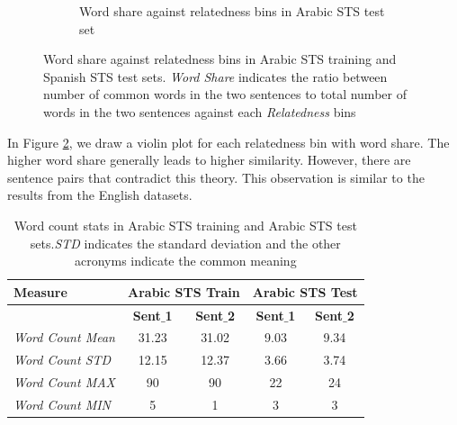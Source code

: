\begin{enumerate}
\begin{figure}
\begin{subfigure}[b]{.5\textwidth}
		\caption{Word share against relatedness bins in Arabic STS test set}
		\label{fig:arabic_sts_test_word_share}
	\end{subfigure}
	\caption[Word share against relatedness bins in Arabic STS training and Arabic STS test sets.]{Word share against relatedness bins in Arabic STS training and Spanish STS test sets. \textit{Word Share} indicates the ratio between number of common words in the two sentences to total number of words in the two sentences against each \textit{Relatedness} bins}
	\label{fig:arabic_sts_word_share}
\end{figure}

In Figure \ref{fig:arabic_sts_word_share}, we draw a violin plot for each relatedness bin with word share. The higher word share generally leads to higher similarity. However, there are sentence pairs that contradict this theory. This observation is similar to the results from the English datasets. 


\begin{table}
	\centering
	\begin{tabular}{l|cc|cc}
		\hline
		Measure   & \multicolumn{2}{c|}{Arabic STS Train} & \multicolumn{2}{c}{Arabic STS Test} \\
		\hline
		\multicolumn{1}{l|}{} & \textbf{Sent$\_$1} & \textbf{Sent$\_$2} & \textbf{Sent$\_$1} & \textbf{Sent$\_$2} \\
		\textit{Word Count Mean} & 31.23 & 31.02 & 9.03 & 9.34  \\
		\textit{Word Count STD} & 12.15 & 12.37 & 3.66 & 3.74  \\
		\textit{Word Count MAX} & 90 & 90 & 22 & 24  \\
		\textit{Word Count MIN} & 5 & 1 & 3 & 3  \\
		\hline
	\end{tabular}
	\caption[Word count stats in Arabic STS]{Word count stats in Arabic STS training and Arabic STS test sets.\textit{STD} indicates the standard deviation and the other acronyms indicate the common meaning }
	\label{table:arabic_sts}
\end{table}	


\end{enumerate}
